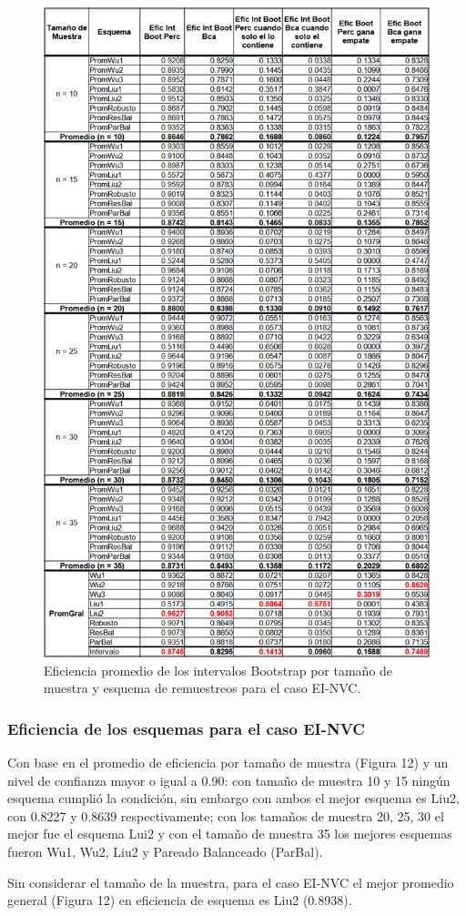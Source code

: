 \begin{figure}[ht] 
	\centering 
	\includegraphics[width=0.55\linewidth]{img/EI_NVC_Efic_Boots.png} 
	\caption{Eficiencia promedio de los intervalos Bootstrap por tamaño de muestra y esquema de remuestreos para el caso EI-NVC.} 
	\label{fig:EI_NVC_Boots}
\end{figure}
\FloatBarrier


\subsubsection{Eficiencia de los esquemas para el caso EI-NVC}
Con base en el promedio de eficiencia por tamaño de muestra (Figura 12) y un nivel de confianza mayor o igual a 0.90: con tamaño de muestra 10 y 15 ningún esquema cumplió la condición, sin embargo con ambos el mejor esquema es Liu2, con 0.8227 y 0.8639 respectivamente; con los tamaños de muestra 20, 25, 30 el mejor fue el esquema Lui2 y con el tamaño de muestra 35 los mejores esquemas fueron Wu1, Wu2, Liu2 y Pareado Balanceado (ParBal).
\vspace{.5cm}

Sin considerar el tamaño de la muestra, para el caso EI-NVC el mejor promedio general (Figura 12) en eficiencia de esquema es Liu2 (0.8938).


